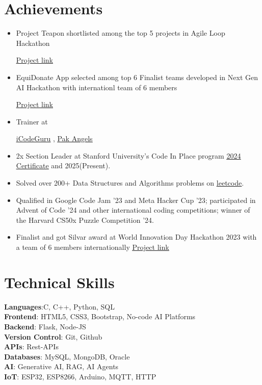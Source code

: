 \documentclass[letterpaper,11pt]{article}
\newcommand{\resumeItem}[1]{
  \item\small{
    {#1 \vspace{-2pt}}
  }
}
\newcommand{\resumeSubHeadingListStart}{\begin{itemize}[leftmargin=0.15in, label={}]}
\newcommand{\resumeSubHeadingListEnd}{\end{itemize}}
\newcommand{\resumeItemListStart}{\begin{itemize}}
\newcommand{\resumeItemListEnd}{\end{itemize}\vspace{-5pt}}
\begin{document}
\section{Achievements}
\resumeItemListStart
\resumeItem{Project Teapon shortlisted among the top 5 projects in Agile Loop Hackathon}
    {\href{https://github.com/inamprograms/Teepon}{\underline{Project link}}}
    \resumeItem{EquiDonate App selected among top 6 Finalist teams developed in Next Gen AI Hackathon with internationl team of 6 members}
        {\href{https://github.com/inamprograms/Food-complaint-resolution-app}{\underline{Project link}}}
\resumeItem{Trainer at}
    {\href{https://www.linkedin.com/company/icode-guru/}{\underline{iCodeGuru}}} ,
    {\href{https://www.linkedin.com/company/PakAngels}{\underline{Pak Angels}}}
\resumeItem{2x Section Leader at Stanford University's Code In Place program {\href{https://digitalcredential.stanford.edu/check/90A694D9E5CDA5C38E96B18BA4F2CDCFCFD4EAB1244A668D52302C1921BFA955Q0lMNUo3TjRMbGRkV2JTNDVnb2hzT2Zwb1cwbm5EZGczMXR6VEFETk5meklCNExS}{\underline{2024 Certificate}}} and 2025(Present).}
\resumeItem{Solved over 200+ Data Structures and Algorithms problems on {\href{https://leetcode.com/inamulrehman09/}{\underline{leetcode}}}.}
\resumeItem{Qualified in Google Code Jam ’23 and Meta Hacker Cup ’23; participated in Advent of Code ’24 and other international coding competitions; winner of the Harvard CS50x Puzzle Competition ’24.}
\resumeItem{Finalist and got Silvar award at World Innovation Day Hackathon 2023 with a team of 6 members internationally
    {\href{https://github.com/inamprograms/EquiDonate}{\underline{Project link}}}}
\resumeItemListEnd

\section{Technical Skills}
\begin{itemize}[leftmargin=0.15in, label={}]
  \small{\item{
        \textbf{Languages}{:C, C++, Python, SQL} \\
        \textbf{Frontend}{: HTML5, CSS3, Bootstrap, No-code AI Platforms} \\
        \textbf{Backend}{: Flask, Node-JS} \\
        \textbf{Version Control}{: Git, Github} \\
        \textbf{APIs}{: Rest-APIs} \\
        \textbf{Databases}{: MySQL, MongoDB, Oracle}\\
        \textbf{AI}{: Generative AI, RAG, AI Agents}\\
        \textbf{IoT}{: ESP32, ESP8266, Arduino, MQTT, HTTP}\\
        }}
\end{itemize}
\end{document}
